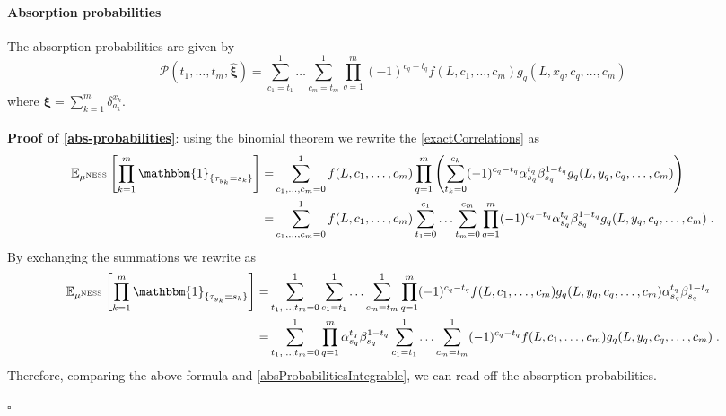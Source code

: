 \documentclass[10pt]{article}
\numberwithin{equation}{section}
\numberwithin{equation}{subsection}
\newcommand{\dt}{\;.}
\begin{document}
\paragraph{Absorption probabilities}
The absorption probabilities are given by  
\begin{equation}\label{abs-probabilities}
	\mathcal{P}(t_{1},\ldots,t_{m},\hat{\bm{\xi}})=\sum_{c_{1}=t_{1}}^{1}\ldots\sum_{c_{m}=t_{m}}^{1}\prod_{q=1}^{m}(-1)^{c_{q}-t_{q}}f(L,c_{1},\ldots,c_{m})g_{q}(L,x_{q},c_{q},\ldots,c_{m})
\end{equation}
where $\bm{\xi}=\sum_{k=1}^{m}\delta_{a_{k}}^{x_{k}}$. \\ \\
\textbf{Proof of \eqref{abs-probabilities}}: 
 using the binomial theorem we rewrite the \eqref{exactCorrelations} as 
\begin{equation}
	\begin{split}
		\mathbb{E}_{\mu^{\text{NESS}}}\left[\prod_{k=1}^{m}\mathbbm{1}_{\{\tau_{y_{k}}=s_{k}\}}\right]=&
		\sum_{c_{1},\ldots,c_{m}=0}^{1}
		f(L,c_{1},\ldots,c_{m})\prod_{q=1}^{m}\left(\sum_{t_{k}=0}^{c_{k}}(-1)^{c_{q}-t_{q}}\alpha_{s_{q}}^{t_{q}}\beta_{s_{q}}^{1-t_{q}}g_{q}(L,y_{q},c_{q},\ldots,c_{m})\right)\\
		=&\sum_{c_{1},\ldots,c_{m}=0}^{1}
		f(L,c_{1},\ldots,c_{m})\sum_{t_{1}=0}^{c_{1}}\ldots\sum_{t_{m}=0}^{c_{m}}\prod_{q=1}^{m}(-1)^{c_{q}-t_{q}}\alpha_{s_{q}}^{t_{q}}\beta_{s_{q}}^{1-t_{q}}g_{q}(L,y_{q},c_{q},\ldots,c_{m})\dt
	\end{split}
\end{equation}
By exchanging the summations we rewrite as 
\begin{equation}
	\begin{split}
		\mathbb{E}_{\mu^{\text{NESS}}}\left[\prod_{k=1}^{m}\mathbbm{1}_{\{\tau_{y_{k}}=s_{k}\}}\right]=&\sum_{t_{1},\ldots,t_{m}=0}^{1}
		\sum_{c_{1}=t_{1}}^{1}\ldots\sum_{c_{m}=t_{m}}^{1}\prod_{q=1}^{m}(-1)^{c_{q}-t_{q}}f(L,c_{1},\ldots,c_{m})g_{q}(L,y_{q},c_{q},\ldots,c_{m})\alpha_{s_{q}}^{t_{q}}\beta_{s_{q}}^{1-t_{q}}\\
		=&\sum_{t_{1},\ldots,t_{m}=0}^{1}\prod_{q=1}^{m}\alpha_{s_{q}}^{t_{q}}\beta_{s_{q}}^{1-t_{q}}\sum_{c_{1}=t_{1}}^{1}\ldots\sum_{c_{m}=t_{m}}^{1}(-1)^{c_{q}-t_{q}}f(L,c_{1},\ldots,c_{m})g_{q}(L,y_{q},c_{q},\ldots,c_{m})\dt
	\end{split}
\end{equation}
Therefore, comparing the above formula and \eqref{absProbabilitiesIntegrable}, we can read off the absorption probabilities. 
\begin{flushright}
	$\square$
\end{flushright}
\end{document}

